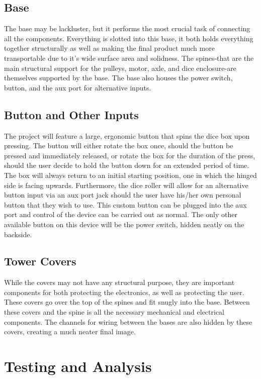\documentclass[12pt]{article}
\begin{document}
\newpage
\subsection{Base}
The base may be lackluster, but it performs the most crucial task of connecting all the components. Everything is slotted into this base, it both holds everything together structurally as well as making the final product much more transportable due to it's wide surface area and solidness. The spines-that are the main structural support for the pulleys, motor, axle, and dice enclosure-are themselves supported by the base. The base also houses the power switch, button, and the aux port for alternative inputs.

\subsection{Button and Other Inputs}
The project will feature a large, ergonomic button that spins the dice box upon pressing. The button will either rotate the box once, should the button be pressed and immediately released, or rotate the box for the duration of the press, should the user decide to hold the button down for an extended period of time. The box will always return to an initial starting position, one in which the hinged side is facing upwards. Furthermore, the dice roller will allow for an alternative button input via an aux port jack should the user have his/her own personal button that they wish to use. This custom button can be plugged into the aux port and control of the device can be carried out as normal. The only other available button on this device will be the power switch, hidden neatly on the backside.

\subsection{Tower Covers}
While the covers may not have any structural purpose, they are important components for both protecting the electronics, as well as protecting the user. These covers go over the top of the spines and fit snugly into the base. Between these covers and the spine is all the necessary mechanical and electrical components. The channels for wiring between the bases are also hidden by these covers, creating a much neater final image.

\newpage
\section{Testing and Analysis}
\end{document}
